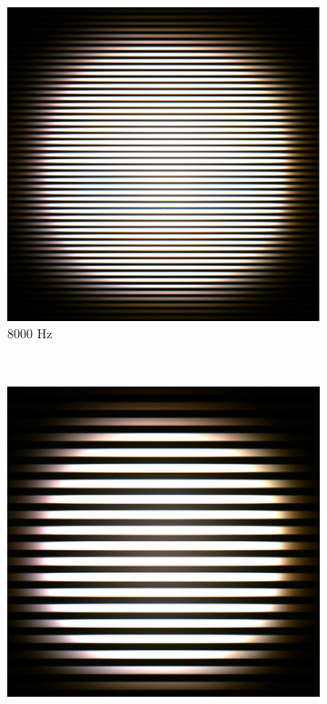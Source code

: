 \begin{figure}[!t]
\centering
  \begin{subfigure}[h]{0.12\textwidth}
  \includegraphics[width=\textwidth]{fig/strip1.png}
  \caption{8000 Hz}
  \end{subfigure}
  ~ 
  \begin{subfigure}[h]{0.12\textwidth}
  \includegraphics[width=\textwidth]{fig/strip2.png}

\end{subfigure}
\end{figure}
